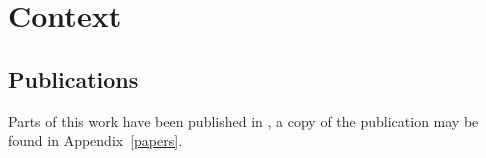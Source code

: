 \section*{Context}

\subsection*{Publications}
Parts of this work have been published in \cite{mccluskey_pylj_2018}, a copy of the publication may be found in Appendix~\ref{papers}.
